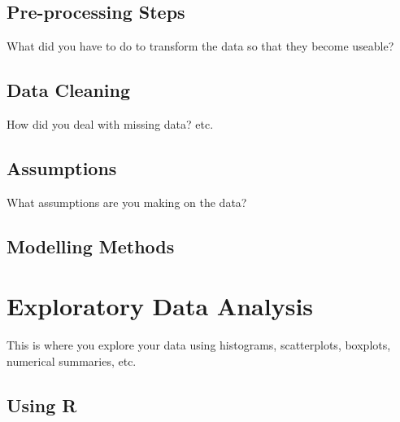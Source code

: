 \documentclass[mstat,12pt]{unswthesis}
\newenvironment{Shaded}{\begin{snugshade}}{\end{snugshade}}
\newcommand{\DataTypeTok}[1]{\textcolor[rgb]{0.13,0.29,0.53}{#1}}
\newcommand{\KeywordTok}[1]{\textcolor[rgb]{0.13,0.29,0.53}{\textbf{#1}}}
\newcommand{\NormalTok}[1]{#1}
\newcommand{\StringTok}[1]{\textcolor[rgb]{0.31,0.60,0.02}{#1}}
\begin{document}
\hypertarget{pre-processing-steps}{%
\section{Pre-processing Steps}\label{pre-processing-steps}}

What did you have to do to transform the data so that they become
useable?

\hypertarget{data-cleaning}{%
\section{Data Cleaning}\label{data-cleaning}}

How did you deal with missing data? etc.

\hypertarget{assumptions}{%
\section{Assumptions}\label{assumptions}}

What assumptions are you making on the data?

\hypertarget{modelling-methods}{%
\section{Modelling Methods}\label{modelling-methods}}

\hypertarget{exploratory-data-analysis}{%
\chapter{Exploratory Data Analysis}\label{exploratory-data-analysis}}

This is where you explore your data using histograms, scatterplots,
boxplots, numerical summaries, etc.

\hypertarget{using-r}{%
\section{Using R}\label{using-r}}

\begin{Shaded}
\end{Shaded}
\end{document}
